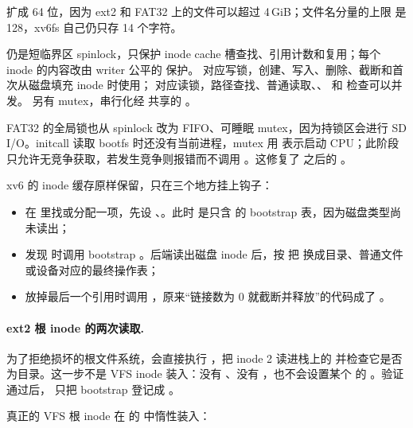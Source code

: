  扩成 64 位，因为 ext2 和 FAT32 上的文件可以超过 4\,GiB；文件名分量的上限  是 128，xv6fs 自己仍只存 14 个字符。

 仍是短临界区 spinlock，只保护 inode cache 槽查找、引用计数和复用；每个 inode 的内容改由 writer 公平的  保护。 对应写锁，创建、写入、删除、截断和首次从磁盘填充 inode 时使用； 对应读锁，路径查找、普通读取、、 和  检查可以并发。 另有  mutex，串行化经  共享的 。

FAT32 的全局锁也从 spinlock 改为 FIFO、可睡眠 mutex，因为持锁区会进行 SD I/O。initcall 读取 bootfs 时还没有当前进程，mutex 用  表示启动 CPU；此阶段只允许无竞争获取，若发生竞争则报错而不调用 。这修复了  之后的 。

xv6 的 inode 缓存原样保留，只在三个地方挂上钩子：

\begin{itemize}
  \item {} 在  里找或分配一项，先设 、。此时  是只含  的 bootstrap 表，因为磁盘类型尚未读出；
  \item {} 发现  时调用 bootstrap 。后端读出磁盘 inode 后，按  把  换成目录、普通文件或设备对应的最终操作表；
  \item {} 放掉最后一个引用时调用 ，原来“链接数为 0 就截断并释放”的代码成了 。
\end{itemize}

\paragraph{ext2 根 inode 的两次读取.}
 为了拒绝损坏的根文件系统，会直接执行 ，把 inode 2 读进栈上的  并检查它是否为目录。这一步不是 VFS inode 装入：没有 、没有 ，也不会设置某个  的 。验证通过后， 只把 bootstrap  登记成 。

真正的 VFS 根 inode 在  的  中惰性装入：

